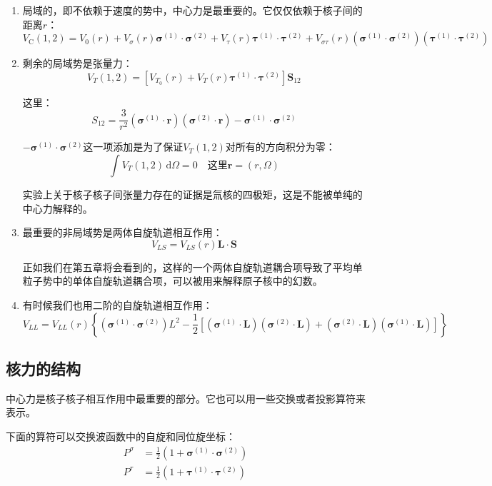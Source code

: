 \begin{enumerate}
\item 局域的，即不依赖于速度的势中，中心力是最重要的。它仅仅依赖于核子间的距离$r$：
\begin{equation}
V_{\text{C}}(1,2)=V_{0}(r)+V_{\sigma}(r)\boldsymbol{\sigma}^{(1)}\cdot\boldsymbol{\sigma}^{(2)}+V_{\tau}(r)\boldsymbol{\tau}^{(1)}\cdot\boldsymbol{\tau}^{(2)}+V_{\sigma\tau}(r)(\boldsymbol{\sigma}^{(1)}\cdot\boldsymbol{\sigma}^{(2)})(\boldsymbol{\tau}^{(1)}\cdot\boldsymbol{\tau}^{(2)})\label{eq:center force}
\end{equation}
\item 剩余的局域势是张量力：
\[
V_{T}(1,2)=[V_{T_{0}}(r)+V_{T}(r)\boldsymbol{\tau}^{(1)}\cdot\boldsymbol{\tau}^{(2)}]\boldsymbol{S}_{12}
\]

这里：
\[
S_{12}=\frac{3}{r^{2}}(\boldsymbol{\sigma}^{(1)}\cdot\boldsymbol{r})(\boldsymbol{\sigma}^{(2)}\cdot\boldsymbol{r})-\boldsymbol{\sigma}^{(1)}\cdot\boldsymbol{\sigma}^{(2)}
\]

$-\boldsymbol{\sigma}^{(1)}\cdot\boldsymbol{\sigma}^{(2)}$这一项添加是为了保证$V_{T}(1,2)$对所有的方向积分为零：
\[
\int V_{T}(1,2)\,\mathrm{d}\Omega=0\quad\text{这里}\boldsymbol{r}=(r,\Omega)
\]

实验上关于核子核子间张量力存在的证据是氚核的四极矩，这是不能被单纯的中心力解释的。
\item 最重要的非局域势是两体自旋轨道相互作用：
\[
V_{LS}=V_{LS}(r)\boldsymbol{L}\cdot\boldsymbol{S}
\]

正如我们在第五章将会看到的，这样的一个两体自旋轨道耦合项导致了平均单粒子势中的单体自旋轨道耦合项，可以被用来解释原子核中的幻数。
\item 有时候我们也用二阶的自旋轨道相互作用：
\[
V_{LL}=V_{LL}(r)\left\{ (\boldsymbol{\sigma}^{(1)}\cdot\boldsymbol{\sigma}^{(2)})L^{2}-\frac{1}{2}\left[(\boldsymbol{\sigma}^{(1)}\cdot\boldsymbol{L})(\boldsymbol{\sigma}^{(2)}\cdot\boldsymbol{L})+(\boldsymbol{\sigma}^{(2)}\cdot\boldsymbol{L})(\boldsymbol{\sigma}^{(1)}\cdot\boldsymbol{L})\right]\right\} 
\]
\end{enumerate}

\subsection{核力的结构}

中心力是核子核子相互作用中最重要的部分。它也可以用一些交换或者投影算符来表示。

下面的算符可以交换波函数中的自旋和同位旋坐标：
\begin{align*}
P^{\sigma} & =\frac{1}{2}(1+\boldsymbol{\sigma}^{(1)}\cdot\boldsymbol{\sigma}^{(2)})\\
P^{\tau} & =\frac{1}{2}(1+\boldsymbol{\tau}^{(1)}\cdot\boldsymbol{\tau}^{(2)})
\end{align*}

